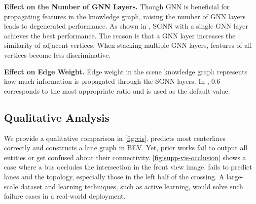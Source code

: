 \smallskip
\noindent
\textbf{Effect on the Number of GNN Layers.}
Though GNN is beneficial for propagating features in the knowledge graph, raising the number of GNN layers leads to degenerated performance. As shown in , SGNN with a single GNN layer achieves the best performance. The reason is that a GNN layer increases the similarity of adjacent vertices. When stacking multiple GNN layers, features of all vertices become less discriminative.






\smallskip
\noindent
\textbf{Effect on Edge Weight.}
Edge weight in the scene knowledge graph represents how much information is propagated through the SGNN layers. In , 0.6 corresponds to the most appropriate ratio and is used as the default value.


\subsection{Qualitative Analysis}


We provide a qualitative comparison in \cref{fig:vis}. \algname predicts most centerlines correctly and constructs a lane graph in BEV. Yet, prior works fail to output all entities or get confused about their connectivity. 
\cref{fig:supp-vis-occlusion} shows a case where a bus occludes the intersection in the front view image. 
\algname fails to predict lanes and the topology, especially those in the left half of the crossing. 
A large-scale dataset and learning techniques, such as active learning, would solve such failure cases in a real-world deployment.
